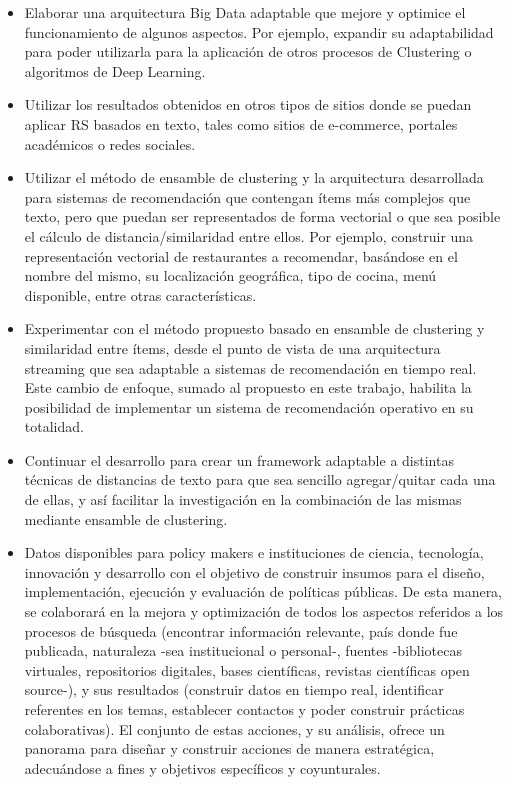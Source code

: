 \begin{itemize}
	\item Elaborar una arquitectura Big Data adaptable que mejore y optimice el funcionamiento de algunos aspectos. Por ejemplo, expandir su adaptabilidad para poder utilizarla para la aplicación de otros procesos de Clustering o algoritmos de Deep Learning.
	\item Utilizar los resultados obtenidos en otros tipos de sitios donde se puedan aplicar RS basados en texto, tales como sitios de e-commerce, portales académicos o redes sociales.
	\item Utilizar el método de ensamble de clustering y la arquitectura desarrollada para sistemas de recomendación que contengan ítems más complejos que texto, pero que puedan ser representados de forma vectorial o que sea posible el cálculo de distancia/similaridad entre ellos. Por ejemplo, construir una representación vectorial de restaurantes a recomendar, basándose en el nombre del mismo, su localización geográfica, tipo de cocina, menú disponible, entre otras características.
	\item Experimentar con el método propuesto basado en ensamble de clustering y similaridad entre ítems, desde el punto de vista de una arquitectura streaming que sea adaptable a sistemas de recomendación en tiempo real. Este cambio de enfoque, sumado al propuesto en este trabajo, habilita la posibilidad de implementar un sistema de recomendación operativo en su totalidad.
	\item Continuar el desarrollo para crear un framework adaptable a distintas técnicas de distancias de texto para que sea sencillo agregar/quitar cada una de ellas, y así facilitar la investigación en la combinación de las mismas mediante ensamble de clustering.
	\item Datos disponibles para policy makers e instituciones de ciencia, tecnología, innovación y desarrollo con el objetivo de construir insumos para el diseño, implementación, ejecución y evaluación de políticas públicas. De esta manera, se colaborará en la mejora y optimización de todos los aspectos referidos a los procesos de búsqueda (encontrar información relevante, país donde fue publicada, naturaleza -sea institucional o personal-, fuentes -bibliotecas virtuales, repositorios digitales, bases científicas, revistas científicas open source-), y sus resultados (construir datos en tiempo real, identificar referentes en los temas, establecer contactos y poder construir prácticas colaborativas). El conjunto de estas acciones, y su análisis, ofrece un panorama para diseñar y construir acciones de manera estratégica, adecuándose a fines y objetivos específicos y coyunturales.
\end{itemize}
